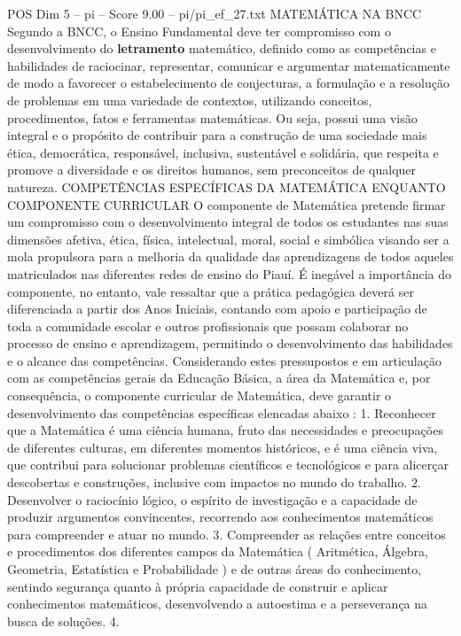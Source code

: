 \begin{textsample}{POS Dim 5 – pi – Score 9.00 – pi/pi\_ef\_27.txt}  \label{ex:f5_pos_231}
MATEMÁTICA NA BNCC Segundo a BNCC, o Ensino Fundamental deve ter compromisso com o desenvolvimento do \textbf{letramento} matemático, definido como as competências e habilidades de raciocinar, representar, comunicar e argumentar matematicamente de modo a favorecer o estabelecimento de conjecturas, a formulação e a resolução de problemas em uma variedade de contextos, utilizando conceitos, procedimentos, fatos e ferramentas matemáticas.
Ou seja, possui uma visão integral e o propósito de contribuir para a construção de uma sociedade mais ética, democrática, responsável, inclusiva, sustentável e solidária, que respeita e promove a diversidade e os direitos humanos, sem preconceitos de qualquer natureza.
COMPETÊNCIAS ESPECÍFICAS DA MATEMÁTICA ENQUANTO COMPONENTE CURRICULAR O componente de Matemática pretende firmar um compromisso com o desenvolvimento integral de todos os estudantes nas suas dimensões afetiva, ética, física, intelectual, moral, social e simbólica visando ser a mola propulsora para a melhoria da qualidade das aprendizagens de todos aqueles matriculados nas diferentes redes de ensino do Piauí.
É inegável a importância do componente, no entanto, vale ressaltar que a prática pedagógica deverá ser diferenciada a partir dos Anos Iniciais, contando com apoio e participação de toda a comunidade escolar e outros profissionais que possam colaborar no processo de ensino e aprendizagem, permitindo o desenvolvimento das habilidades e o alcance das competências.
Considerando estes pressupostos e em articulação com as competências gerais da Educação Básica, a área da Matemática e, por consequência, o componente curricular de Matemática, deve garantir o desenvolvimento das competências específicas elencadas abaixo : 1.
Reconhecer que a Matemática é uma ciência humana, fruto das necessidades e preocupações de diferentes culturas, em diferentes momentos históricos, e é uma ciência viva, que contribui para solucionar problemas científicos e tecnológicos e para alicerçar descobertas e construções, inclusive com impactos no mundo do trabalho. 2.
Desenvolver o raciocínio lógico, o espírito de investigação e a capacidade de produzir argumentos convincentes, recorrendo aos conhecimentos matemáticos para compreender e atuar no mundo. 3.
Compreender as relações entre conceitos e procedimentos dos diferentes campos da Matemática ( Aritmética, Álgebra, Geometria, Estatística e Probabilidade ) e de outras áreas do conhecimento, sentindo segurança quanto à própria capacidade de construir e aplicar conhecimentos matemáticos, desenvolvendo a autoestima e a perseverança na busca de soluções. 4.

\end{textsample}
